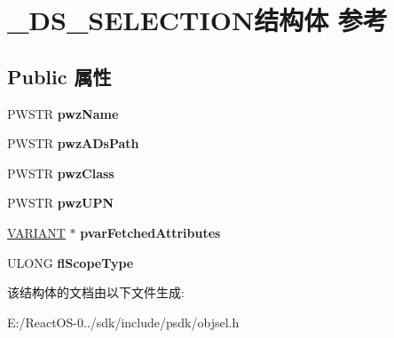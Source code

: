 \hypertarget{struct___d_s___s_e_l_e_c_t_i_o_n}{}\section{\+\_\+\+D\+S\+\_\+\+S\+E\+L\+E\+C\+T\+I\+O\+N结构体 参考}
\label{struct___d_s___s_e_l_e_c_t_i_o_n}
\subsection*{Public 属性}
\begin{DoxyCompactItemize}
\item 
\mbox{\label{struct___d_s___s_e_l_e_c_t_i_o_n_a73b2101697edee3cdbd554627dc8e62d}} 
P\+W\+S\+TR {\bfseries pwz\+Name}
\item 
\mbox{\label{struct___d_s___s_e_l_e_c_t_i_o_n_a83747d3ce70316f6b9542265f4e47ad9}} 
P\+W\+S\+TR {\bfseries pwz\+A\+Ds\+Path}
\item 
\mbox{\label{struct___d_s___s_e_l_e_c_t_i_o_n_a05d79644fe6c91e9028f182c88400512}} 
P\+W\+S\+TR {\bfseries pwz\+Class}
\item 
\mbox{\label{struct___d_s___s_e_l_e_c_t_i_o_n_ac34738ef17feeb890f228c3407b879a6}} 
P\+W\+S\+TR {\bfseries pwz\+U\+PN}
\item 
\mbox{\label{struct___d_s___s_e_l_e_c_t_i_o_n_abc93f2e798e09e0d0ddb09d5d79ae3b3}} 
\hyperlink{structtag_v_a_r_i_a_n_t}{V\+A\+R\+I\+A\+NT} $\ast$ {\bfseries pvar\+Fetched\+Attributes}
\item 
\mbox{\label{struct___d_s___s_e_l_e_c_t_i_o_n_aeedf133a720c44b9dfd8ece9e61a8d5f}} 
U\+L\+O\+NG {\bfseries fl\+Scope\+Type}
\end{DoxyCompactItemize}


该结构体的文档由以下文件生成\+:\begin{DoxyCompactItemize}
\item 
E\+:/\+React\+O\+S-\/0../sdk/include/psdk/objsel.\+h\end{DoxyCompactItemize}
